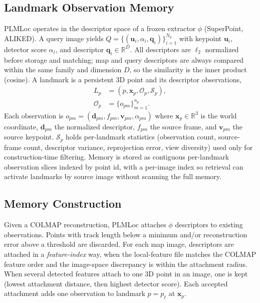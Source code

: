 \documentclass[letterpaper,10 pt,conference]{ieeeconf}
\newcommand{\method}{PLMLoc}
\begin{document}
\subsection{Landmark Observation Memory}
\method{} operates in the descriptor space of a frozen extractor $\phi$ (SuperPoint, ALIKED). A query image yields $Q=\{(\mathbf{u}_i,\alpha_i,\mathbf{q}_i)\}_{i=1}^{N_q}$ with keypoint $\mathbf{u}_i$, detector score $\alpha_i$, and descriptor $\mathbf{q}_i\in\mathbb{R}^{D}$. All descriptors are $\ell_2$ normalized before storage and matching; map and query descriptors are always compared within the same family and dimension $D$, so the similarity is the inner product (cosine). A landmark is a persistent 3D point and its descriptor observations,
\begin{equation}
\begin{aligned}
L_p &= (p,\mathbf{x}_p,\mathcal{O}_p,\mathcal{S}_p),\\
\mathcal{O}_p &= \{o_{pm}\}_{m=1}^{n_p}.
\end{aligned}
\label{eq:landmark-memory}
\end{equation}
Each observation is $o_{pm}=(\mathbf{d}_{pm},f_{pm},\mathbf{v}_{pm},\alpha_{pm})$ where $\mathbf{x}_p\in\mathbb{R}^3$ is the world coordinate, $\mathbf{d}_{pm}$ the normalized descriptor, $f_{pm}$ the source frame, and $\mathbf{v}_{pm}$ the source keypoint. $\mathcal{S}_p$ holds per-landmark statistics (observation count, source-frame count, descriptor variance, reprojection error, view diversity) used only for construction-time filtering. Memory is stored as contiguous per-landmark observation slices indexed by point id, with a per-image index so retrieval can activate landmarks by source image without scanning the full memory.

\subsection{Memory Construction}
Given a COLMAP reconstruction, \method{} attaches $\phi$ descriptors to existing observations. Points with track length below a minimum and/or reconstruction error above a threshold are discarded. For each map image, descriptors are attached in a \emph{feature-index} way, when the local-feature file matches the COLMAP feature order and the image-space discrepancy is within the attachment radius. When several detected features attach to one 3D point in an image, one is kept (lowest attachment distance, then highest detector score). Each accepted attachment adds one observation to landmark $p=p_\ell$ at $\mathbf{x}_p$.
\end{document}
